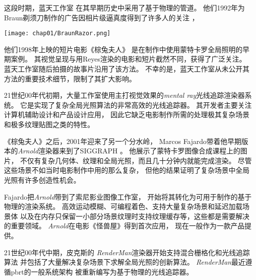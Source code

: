 这段时期，蓝天工作室
在其早期历史中采用了基于物理的管道\citep{ohmer1997}。
他们1992年为Braun剃须刀制作的广告因相片级逼真度得到了许多人的关注
，
\begin{marginfigure}
    \texttt{[image: chap01/BraunRazor.png]}
\end{marginfigure}
他们1998年上映的短片电影《棕兔夫人》
是在制作中使用蒙特卡罗全局照明的早期案例。
其视觉呈现与用Reyes渲染的电影和短片截然不同，获得了广泛关注。
蓝天工作室随后拍摄的故事片沿用了该方法。
不幸的是，蓝天工作室从未公开其方法的重要技术细节，限制了其扩大影响。

21世纪00年代初期，大量工作室使用主打视觉效果的\emph{mental ray}光线追踪渲染器系统。
它是实现了复杂全局光照算法的非常高效的光线追踪器。
其开发者主要关注计算机辅助设计和产品设计应用，
因此它缺乏电影制作所需的处理极其复杂场景和极多纹理贴图之类的特性。

《棕兔夫人》之后，2001年迎来了另一个分水岭，
Marcos Fajardo带着他早期版本的\emph{Arnold}渲染器来到了SIGGRAPH
。
他展示了蒙特卡罗图像合成课程上的图片，
不仅有复杂几何体、纹理和全局光照，而且几十分钟内就能完成渲染。
尽管这些场景不如当时电影制作中用的那么复杂，
但他的结果证明了复杂场景中全局光照有许多创造性机会。

Fajardo把\emph{Arnold}带到了索尼影业图像工作室，
开始将其转化为可用于制作的基于物理的渲染系统。
高效运动模糊、可编程着色、支持大量复杂场景和延迟加载场景体
以及在内存只保留一小部分场景纹理时支持纹理缓存等，这些都是需要解决的重要领域。
\emph{Arnold}在电影《怪兽屋》得到首次应用，
现在一般作为一款产品提供。

21世纪00年代中期，皮克斯的
\emph{RenderMan}渲染器开始支持混合栅格化和光线追踪算法
并包括了大量解决复杂场景下求解全局光照的创新算法。
\emph{RenderMan}最近遵循pbrt的一般系统架构\citep{10.1145/2776880.2792699}
被重新编写为基于物理的光线追踪器。

